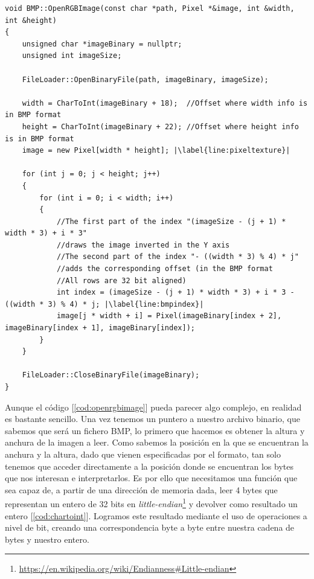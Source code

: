 \begin{lstlisting}[style=C-color, caption={Código para cargar una imagen BMP en nuestro sistema}, label=cod:openrgbimage, escapechar=|]
void BMP::OpenRGBImage(const char *path, Pixel *&image, int &width, int &height)
{
    unsigned char *imageBinary = nullptr;
    unsigned int imageSize;

    FileLoader::OpenBinaryFile(path, imageBinary, imageSize);

    width = CharToInt(imageBinary + 18);  //Offset where width info is in BMP format
    height = CharToInt(imageBinary + 22); //Offset where height info is in BMP format
    image = new Pixel[width * height]; |\label{line:pixeltexture}|

    for (int j = 0; j < height; j++)
    {
        for (int i = 0; i < width; i++)
        {
            //The first part of the index "(imageSize - (j + 1) * width * 3) + i * 3" 
            //draws the image inverted in the Y axis
            //The second part of the index "- ((width * 3) % 4) * j" 
            //adds the corresponding offset (in the BMP format
            //All rows are 32 bit aligned)
            int index = (imageSize - (j + 1) * width * 3) + i * 3 - ((width * 3) % 4) * j; |\label{line:bmpindex}|
            image[j * width + i] = Pixel(imageBinary[index + 2], imageBinary[index + 1], imageBinary[index]);
        }
    }

    FileLoader::CloseBinaryFile(imageBinary);
}
\end{lstlisting}

Aunque el código [\ref{cod:openrgbimage}] pueda parecer algo complejo, en realidad es bastante sencillo. Una vez tenemos un puntero a nuestro archivo binario, que sabemos que será un fichero BMP, lo primero que hacemos es obtener la altura y anchura de la imagen a leer. Como sabemos la posición en la que se encuentran la anchura y la altura, dado que vienen especificadas por el formato, tan solo tenemos que acceder directamente a la posición donde se encuentran los bytes que nos interesan e interpretarlos. Es por ello que necesitamos una función que sea capaz de, a partir de una dirección de memoria dada, leer 4 bytes que representan un entero de 32 bits en \emph{little-endian}\footnote{\url{https://en.wikipedia.org/wiki/Endianness\#Little-endian}} y devolver como resultado un entero [\ref{cod:chartoint}]. Logramos este resultado mediante el uso de operaciones a nivel de bit, creando una correspondencia byte a byte entre nuestra cadena de bytes y nuestro entero.\\

